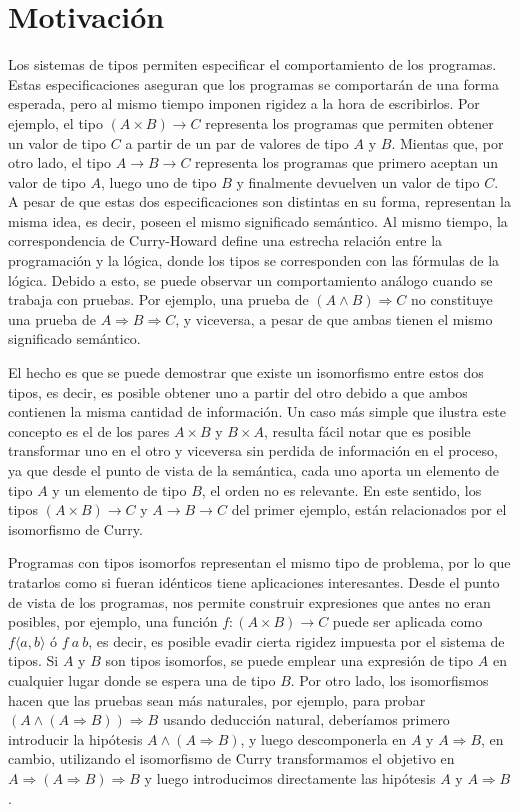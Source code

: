 \section{Motivación}

Los sistemas de tipos permiten especificar el comportamiento de los programas.
Estas especificaciones aseguran que los programas se comportarán de una forma esperada, pero al mismo tiempo imponen rigidez a la hora de escribirlos.
Por ejemplo, el tipo $(A \times B) \rightarrow C$ representa los programas que permiten obtener un valor de tipo $C$ a partir de un par de valores de tipo $A$ y $B$.
Mientas que, por otro lado, el tipo $A \rightarrow B \rightarrow C$ representa los programas que primero aceptan un valor de tipo $A$, luego uno de tipo $B$ y finalmente devuelven un valor de tipo $C$.
A pesar de que estas dos especificaciones son distintas en su forma, representan la misma idea, es decir, poseen el mismo significado semántico.
Al mismo tiempo, la correspondencia de Curry-Howard \cite{sorensen2006lectures} define una estrecha relación entre la programación y la lógica, donde los tipos se corresponden con las fórmulas de la lógica.
Debido a esto, se puede observar un comportamiento análogo cuando se trabaja con pruebas.
Por ejemplo, una prueba de $(A \wedge B) \Rightarrow C$ no constituye una prueba de $A \Rightarrow B \Rightarrow C$, y viceversa, a pesar de que ambas tienen el mismo significado semántico.

El hecho es que se puede demostrar que existe un isomorfismo entre estos dos tipos, es decir, es posible obtener uno a partir del otro debido a que ambos contienen la misma cantidad de información.
Un caso más simple que ilustra este concepto es el de los pares $A \times B$ y $B \times A$, resulta fácil notar que es posible transformar uno en el otro y viceversa sin perdida de información en el proceso, ya que desde el punto de vista de la semántica, cada uno aporta un elemento de tipo $A$ y un elemento de tipo $B$, el orden no es relevante.
En este sentido, los tipos $(A \times B) \rightarrow C$ y $A \rightarrow B \rightarrow C$ del primer ejemplo, están relacionados por el isomorfismo de Curry.

Programas con tipos isomorfos representan el mismo tipo de problema, por lo que tratarlos como si fueran idénticos tiene aplicaciones interesantes.
Desde el punto de vista de los programas, nos permite construir expresiones que antes no eran posibles, por ejemplo, una función $f : (A \times B) \rightarrow C$ puede ser aplicada como $f \langle a, b \rangle$ ó $f \: a \: b$, es decir, es posible evadir cierta rigidez impuesta por el sistema de tipos.
Si $A$ y $B$ son tipos isomorfos, se puede emplear una expresión de tipo $A$ en cualquier lugar donde se espera una de tipo $B$.
Por otro lado, los isomorfismos hacen que las pruebas sean más naturales, por ejemplo, para probar $(A \wedge (A \Rightarrow  B)) \Rightarrow B$ usando deducción natural, deberíamos primero introducir la hipótesis $A \wedge (A \Rightarrow B)$, y luego descomponerla en $A$ y $A \Rightarrow B$, en cambio, utilizando el isomorfismo de Curry transformamos el objetivo en $A \Rightarrow (A \Rightarrow  B) \Rightarrow B$ y luego introducimos directamente las hipótesis $A$ y $A \Rightarrow B$.

